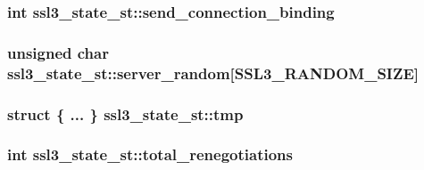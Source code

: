 \subsubsection[{\texorpdfstring{send\+\_\+connection\+\_\+binding}{send_connection_binding}}]{\setlength{\rightskip}{0pt plus 5cm}int ssl3\+\_\+state\+\_\+st\+::send\+\_\+connection\+\_\+binding}\hypertarget{structssl3__state__st_aae1d072da002bba830693703c32c7069}{}\label{structssl3__state__st_aae1d072da002bba830693703c32c7069}
\subsubsection[{\texorpdfstring{server\+\_\+random}{server_random}}]{\setlength{\rightskip}{0pt plus 5cm}unsigned char ssl3\+\_\+state\+\_\+st\+::server\+\_\+random\mbox{[}{\bf S\+S\+L3\+\_\+\+R\+A\+N\+D\+O\+M\+\_\+\+S\+I\+ZE}\mbox{]}}\hypertarget{structssl3__state__st_ae0e0d20a2153469e1f0ee40b5852392b}{}\label{structssl3__state__st_ae0e0d20a2153469e1f0ee40b5852392b}
\subsubsection[{\texorpdfstring{tmp}{tmp}}]{\setlength{\rightskip}{0pt plus 5cm}struct \{ ... \}   ssl3\+\_\+state\+\_\+st\+::tmp}\hypertarget{structssl3__state__st_a3b0d4a10290b65384ce207d4f73530a4}{}\label{structssl3__state__st_a3b0d4a10290b65384ce207d4f73530a4}
\subsubsection[{\texorpdfstring{total\+\_\+renegotiations}{total_renegotiations}}]{\setlength{\rightskip}{0pt plus 5cm}int ssl3\+\_\+state\+\_\+st\+::total\+\_\+renegotiations}\hypertarget{structssl3__state__st_ac3ed20859bef2774159c888b55778745}{}\label{structssl3__state__st_ac3ed20859bef2774159c888b55778745}
